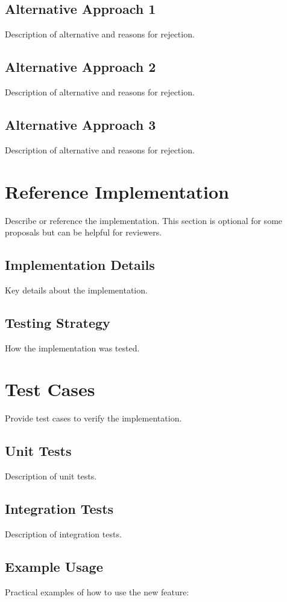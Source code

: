 \documentclass[11pt]{article}
\begin{document}
	\subsection{Alternative Approach 1}
	Description of alternative and reasons for rejection.
	
	\subsection{Alternative Approach 2}
	Description of alternative and reasons for rejection.
	
	\subsection{Alternative Approach 3}
	Description of alternative and reasons for rejection.
	
	\section{Reference Implementation}
	Describe or reference the implementation. This section is optional for some proposals but can be helpful for reviewers.
	
	\subsection{Implementation Details}
	Key details about the implementation.
	
	\subsection{Testing Strategy}
	How the implementation was tested.
	
	\section{Test Cases}
	Provide test cases to verify the implementation.
	
	\subsection{Unit Tests}
	Description of unit tests.
	
	\subsection{Integration Tests}
	Description of integration tests.
	
	\subsection{Example Usage}
	Practical examples of how to use the new feature:
	
\end{document}
